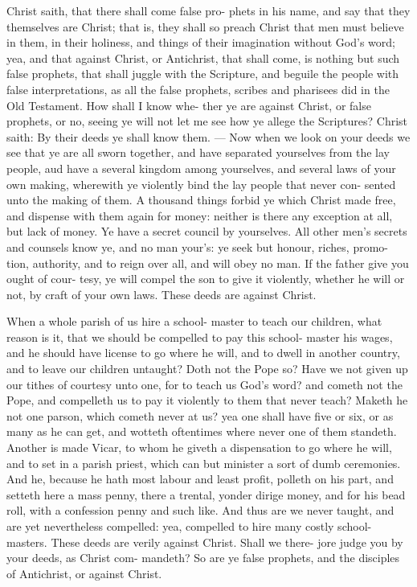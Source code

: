 \documentclass{custom}
\begin{document}
Christ saith, that there shall come false pro- 
phets in his name, and say that they themselves 
are Christ; that is, they shall so preach Christ 
that men must believe in them, in their holiness,
and things of their imagination without God's word; 
yea, and that against Christ, or Antichrist, that 
shall come, is nothing but such false prophets,
that shall juggle with the Scripture, and 
beguile the people with false interpretations, as 
all the false prophets, scribes and pharisees did 
in the Old Testament. How shall I know whe- 
ther ye are against Christ, or false prophets, or 
no, seeing ye will not let me see how ye allege 
the Scriptures? Christ saith: By their deeds 
ye shall know them. — Now when we look on your 
deeds we see that ye are all sworn together, and 
have separated yourselves from the lay people, 
aud have a several kingdom among yourselves, 
and several laws of your own making, wherewith 
ye violently bind the lay people that never con- 
sented unto the making of them. A thousand 
things forbid ye which Christ made free, and 
dispense with them again for money: neither is 
there any exception at all, but lack of money. 
Ye have a secret council by yourselves. All 
other men's secrets and counsels know ye, and no 
man your's: ye seek but honour, riches, promo- 
tion, authority, and to reign over all, and will obey 
no man. If the father give you ought of cour- 
tesy, ye will compel the son to give it violently, 
whether he will or not, by craft of your own 
laws. These deeds are against Christ.

When a whole parish of us hire a school-
master to teach our children, what reason is it, 
that we should be compelled to pay this school- 
master his wages, and he should have license to 
go where he will, and to dwell in another country, 
and to leave our children untaught? Doth not 
the Pope so? Have we not given up our tithes 
of courtesy unto one, for to teach us God's 
word? and cometh not the Pope, and compelleth 
us to pay it violently to them that never teach? 
Maketh he not one parson, which cometh never 
at us? yea one shall have five or six, or as many 
as he can get, and wotteth oftentimes where 
never one of them standeth. Another is made 
Vicar, to whom he giveth a dispensation to go 
where he will, and to set in a parish priest, which 
can but minister a sort of dumb ceremonies. 
And he, because he hath most labour and least 
profit, polleth on his part, and setteth here a mass 
penny, there a trental, yonder dirige money,
and for his bead roll, with a confession penny and 
such like. And thus are we never taught, and 
are yet nevertheless compelled: yea, compelled 
to hire many costly school-masters. These 
deeds are verily against Christ. Shall we there- 
jore judge you by your deeds, as Christ com- 
mandeth? So are ye false prophets, and the 
disciples of Antichrist, or against Christ. 
\end{document}

